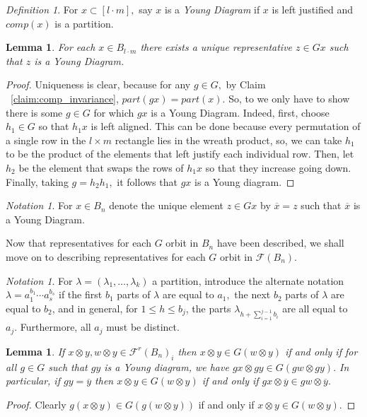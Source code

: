 \documentclass{amsart}
\newtheorem{lem}[thm]{Lemma}
\theoremstyle{remark}
\newtheorem{defn}[thm]{Definition}
\newtheorem{note}[thm]{Notation}
\begin{document}
\begin{defn}
For $x \subset [l\cdot m],$ say $x$ is a {\it Young Diagram} if $x$ is left justified and $comp(x)$ is a partition.
\end{defn}

\begin{lem}
\label{lem:young_diag_reps}
For each $x \in B_{l\cdot m}$ there exists a unique representative $z \in Gx$ such that $z$ is a Young Diagram.
\end{lem}
\begin{proof}
Uniqueness is clear, because for any $g \in G,$ by Claim ~\ref{claim:comp_invariance}, $part(gx) = part(x).$ So, to we only have to show there is some $g \in G$ for which $gx$ is a Young Diagram. Indeed, first, choose $h_1 \in G$ so that $h_1x$ is left aligned. This can be done because every permutation of a single row in the $l\times m$ rectangle lies in the wreath product, so, we can take $h_1$ to be the product of the elements that left justify each individual row. Then, let $h_2$ be the element that swaps the rows of $h_1x$ so that they increase going down. Finally, taking $g = h_2 h_1,$ it follows that $gx$ is a Young diagram. 
\end{proof}

\begin{note}
For $x \in B_n$ denote the unique element $z \in Gx$ by $\overline{x}=z$ such that $\overline{x}$ is a Young Diagram.
\end{note}

Now that representatives for each $G$ orbit in $B_n$ have been described, we shall move on to describing representatives for each $G$ orbit in $\mathcal F(B_n).$

\begin{note}
For $\lambda = (\lambda_1,\ldots, \lambda_k)$ a partition, introduce the alternate notation $\lambda = a_1^{b_1} \cdots a_s^{b_s}$ if the first $b_1$ parts of $\lambda$ are equal to $a_1,$ the next $b_2$ parts of $\lambda$ are equal to $b_2$, and in general, for $1 \leq h\leq b_j$, the parts $ \lambda_{h+\sum_{i=1}^{j-1} b_i}$ are all equal to $a_j.$ Furthermore, all $a_j$ must be distinct.
\end{note}

\begin{lem}
\label{lem:young_diag_reduction}
If $x\otimes y, w \otimes y \in\mathcal F^r(B_n)_i$ then $x\otimes y \in G(w \otimes y)$ if and only if for all $g \in G$ such that $gy$ is a Young diagram, we have $gx \otimes gy \in G(gw \otimes gy).$ In particular, if $gy = \overline y$ then $x\otimes y \in G(w\otimes y)$ if and only if $gx \otimes \overline y \in gw \otimes \overline y.$
\end{lem}
\begin{proof}
Clearly $g(x\otimes y) \in G(g(w\otimes y))$ if and only if $x \otimes y \in G(w \otimes y).$
\end{proof}
\end{document}
